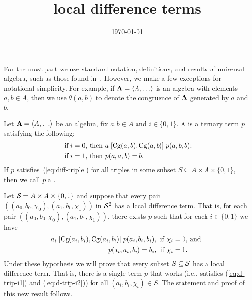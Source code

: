\documentclass[12pt]{amsart}
\numberwithin{equation}{section}
\theoremstyle{plain}
\theoremstyle{definition}
\begin{document}
\title{local difference terms}
\date{\today}
\address{University of Hawaii}


\maketitle

For the most part we use standard notation, definitions, and
results of universal algebra, such as those found in~\cite{MR2839398}.
However, we make a few exceptions for notational simplicity.
For example, if $\bA =\<A, \dots\>$ is an algebra with elements 
$a, b \in A$, then we use $\theta(a,b)$ to denote
the congruence of $\mathbf{A}$ generated by $a$ and $b$.

Let $\bA=\< A, \dots\>$ be an algebra, fix $a, b \in A$ and
$i \in \{0,1\}$.
A  is a ternary term $p$ satisfying the following:
\begin{align}
\text{ if $i=0$, then } & a \mathrel{[\operatorname{Cg}(a,b), \operatorname{Cg}(a,b)]} p(a,b,b); \label{eq:diff-triple}\\
\text{ if $i=1$, then } &p(a,a,b) = b. \nonumber
\end{align}
If $p$ satisfies~(\ref{eq:diff-triple}) for all triples
in some subset $S\subseteq A \times A \times \{0,1\}$, then we call $p$
a .

Let 
$\mathcal{S} = A \times A \times \{0,1\}$ and
suppose that every pair
$((a_0, b_0, \chi_0), (a_1, b_1, \chi_1))$
in $\mathcal{S}^2$ has a local difference term.
That is, for each pair $((a_0, b_0, \chi_0), (a_1, b_1, \chi_1))$, there exists
$p$ such that for each $i \in \{0,1\}$ we have
\begin{align}
  a_i \comm{\Cg(a_i,b_i)}{\Cg(a_i,b_i)} p(a_i,b_i,b_i), & \;
  \text{ if $\chi_i=0$, and }  \label{eq:d-trip-i1}\\
  p(a_i,a_i,b_i) =b_i, & \;
  \text{ if $\chi_i=1$.}\label{eq:d-trip-i2} %
\end{align}
Under these hypothesis we will prove that every subset $S\subseteq \mathcal{S}$
has a local difference term.
That is, there is a single term $p$ that works (i.e., satisfies
(\ref{eq:d-trip-i1}) and (\ref{eq:d-trip-i2})) for all $(a_i, b_i, \chi_i) \in S$.
The statement and proof of this new result follows.
\end{document}
